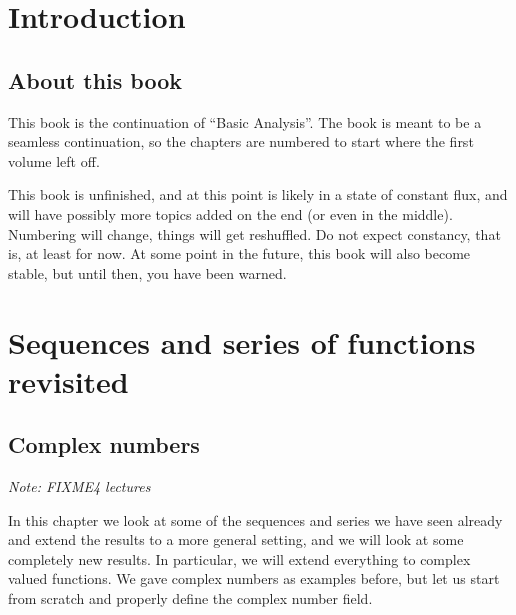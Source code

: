 \documentclass[12pt]{book}
\newcommand{\sectionnotes}[1]{\noindent \emph{Note: #1} \medskip \par}
\theoremstyle{plain}
\theoremstyle{remark}
\theoremstyle{definition}
\theoremstyle{exercise}
\theoremstyle{example}
\begin{document}
\chapter*{Introduction}


\section*{About this book}

This book is the continuation of ``Basic Analysis''.  The book is meant to
be a seamless continuation, so the chapters are numbered to start where the
first volume left off.

This book is unfinished, and at this point is likely in a state of
constant flux, and will have possibly more topics added on the end (or even
in the middle).
Numbering will
change, things will get reshuffled.  Do not expect constancy, that is,
at least for now.  At
some point in the future, this book will also become stable, but until then,
you have been warned.




\chapter{Sequences and series of functions revisited} \label{seqserrev:chapter}


\section{Complex numbers}
\label{sec:complexnums}

\sectionnotes{FIXME4 lectures}

In this chapter we look at some of the sequences and series we have seen
already and extend the results to a more general setting, and we will look
at some completely new results.  In particular, we will extend everything to
complex valued functions.  We gave complex numbers as examples before, but
let us start from scratch and properly define the complex number field.
\end{document}
